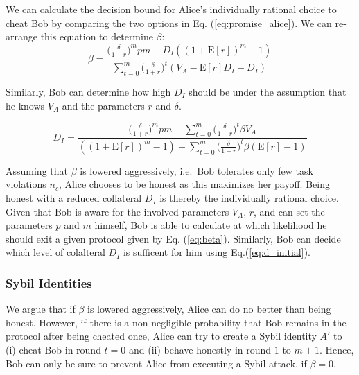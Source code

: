 \documentclass[runningheads]{llncs}
\newcommand{\sys}{Promise\xspace}
\newcommand{\dom}[1]{\todo[linecolor=green,backgroundcolor=green!25,bordercolor=green,inline,caption={}]{Comment by Dominik: #1}}
\begin{document}
We can calculate the decision bound for Alice's individually rational choice to cheat Bob by comparing the two options in Eq. (\ref{eq:promise_alice}).
We can re-arrange this equation to determine $\beta$:
\begin{equation}
    \label{eq:beta}
    \beta = \frac{\big( \frac{\delta}{1+r} \big)^{m} pm - D_{I}((1+\mathrm{E}[r])^{m}-1)}{\sum_{t=0}^{m} \big( \frac{\delta}{1+r} \big)^{t} (V_A - \mathrm{E}[r]D_{I}-D_{I})}
\end{equation}

Similarly, Bob can determine how high $D_I$ should be under the assumption that he knows $V_A$ and the parameters $r$ and $\delta$.

\begin{equation}
    \label{eq:d_initial}
    D_I = \frac{\big( \frac{\delta}{1+r} \big)^{m} pm - \sum_{t=0}^{m} \big( \frac{\delta}{1+r} \big)^{t} \beta V_A}{ ((1+\mathrm{E}[r])^{m}-1) - \sum_{t=0}^{m} \big( \frac{\delta}{1+r} \big)^{t} \beta (\mathrm{E}[r]-1)}
\end{equation}

Assuming that $\beta$ is lowered aggressively, i.e.\ Bob tolerates only few task violations $n_c$, Alice  chooses to be honest as this maximizes her payoff.
Being honest with a reduced collateral $D_I$ is thereby the individually rational choice.
Given that Bob is aware for the involved parameters $V_A$, $r$, and can set the parameters $p$ and $m$ himself, Bob is able to calculate at which likelihood he should exit a given protocol given by Eq. (\ref{eq:beta}).
Similarly, Bob can decide which level of colalteral $D_I$ is sufficent for him using Eq.(\ref{eq:d_initial}).

\subsubsection{Sybil Identities}
We argue that if $\beta$ is lowered aggressively, Alice can do no better than being honest.
However, if there is a non-negligible probability that Bob remains in the protocol after being cheated once, Alice can try to create a Sybil identity $A'$ to (i) cheat Bob in round $t=0$ and (ii) behave honestly in round $1$ to $m+1$.
Hence, Bob can only be sure to prevent Alice from executing a Sybil attack, if $\beta = 0$.
\end{document}
